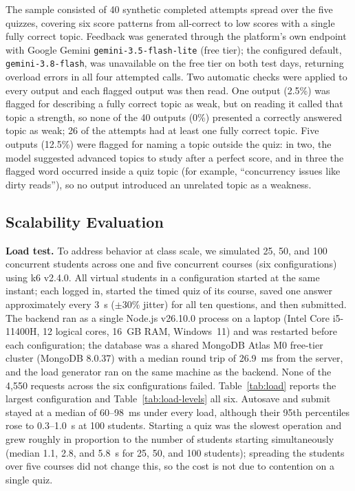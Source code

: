 \documentclass[conference]{IEEEtran}
\begin{document}
The sample consisted of 40 synthetic completed attempts spread over the five quizzes, covering six score patterns from all-correct to low scores with a single fully correct topic. Feedback was generated through the platform's own endpoint with Google Gemini \texttt{gemini-3.5-flash-lite} (free tier); the configured default, \texttt{gemini-3.8-flash}, was unavailable on the free tier on both test days, returning overload errors in all four attempted calls. Two automatic checks were applied to every output and each flagged output was then read. One output (2.5\%) was flagged for describing a fully correct topic as weak, but on reading it called that topic a strength, so none of the 40 outputs (0\%) presented a correctly answered topic as weak; 26 of the attempts had at least one fully correct topic. Five outputs (12.5\%) were flagged for naming a topic outside the quiz: in two, the model suggested advanced topics to study after a perfect score, and in three the flagged word occurred inside a quiz topic (for example, ``concurrency issues like dirty reads''), so no output introduced an unrelated topic as a weakness.

\subsection{Scalability Evaluation}

\textbf{Load test.} To address behavior at class scale, we simulated 25, 50, and 100 concurrent students across one and five concurrent courses (six configurations) using k6 v2.4.0. All virtual students in a configuration started at the same instant; each logged in, started the timed quiz of its course, saved one answer approximately every 3~s ($\pm$30\% jitter) for all ten questions, and then submitted. The backend ran as a single Node.js v26.10.0 process on a laptop (Intel Core i5-11400H, 12 logical cores, 16~GB RAM, Windows~11) and was restarted before each configuration; the database was a shared MongoDB Atlas M0 free-tier cluster (MongoDB 8.0.37) with a median round trip of 26.9~ms from the server, and the load generator ran on the same machine as the backend. None of the 4,550 requests across the six configurations failed. Table~\ref{tab:load} reports the largest configuration and Table~\ref{tab:load-levels} all six. Autosave and submit stayed at a median of 60--98~ms under every load, although their 95th percentiles rose to 0.3--1.0~s at 100 students. Starting a quiz was the slowest operation and grew roughly in proportion to the number of students starting simultaneously (median 1.1, 2.8, and 5.8~s for 25, 50, and 100 students); spreading the students over five courses did not change this, so the cost is not due to contention on a single quiz.
\end{document}
